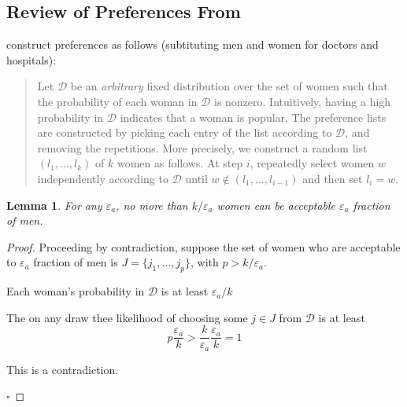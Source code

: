 \documentclass[WP]{AEA}
\newtheorem{lemma}{Lemma}
\begin{document}
\subsection{Review of Preferences From \cite{Immorlica2005}} \label{appendix:immorlica_pref}

\cite{Immorlica2005} construct preferences as follows (subtituting men and women for doctors and hospitals):
\begin{quote}
	Let $\mathcal{D}$ be an \emph{arbitrary} fixed distribution over the set of women such that the probability of each woman in 
	$\mathcal{D}$ is nonzero. Intuitively, having a high probability in $\mathcal{D}$ indicates that a woman is popular. 
	The preference lists are constructed by picking each entry of the list according to $\mathcal{D}$, and removing the repetitions. More precisely, we construct a random list $(l_1, ..., l_k)$
	of $k$ women as follows. At step $i$, repeatedly select women $w$ independently according to $\mathcal{D}$ until $w \notin (l_1, ..., l_{i-1})$ and then set $l_i = w$.
\end{quote}

\begin{lemma}
	For any $\varepsilon_a$, no more than $k/\varepsilon_a$ women can be acceptable $\varepsilon_a$ fraction of men.
\end{lemma}
\begin{proof}
	Proceeding by contradiction, suppose the set of women who are acceptable to $\varepsilon_a$ fraction of men is $J = \{j_1,..., j_p\}$, with $p > k/\varepsilon_a$. 

	Each woman's probability in $\mathcal{D}$ is at least $\varepsilon_a/k$

	The on any draw thee likelihood of choosing some $j\in J$ from $\mathcal{D}$ is at least $$p \frac{\varepsilon_a}{k} > \frac{k}{\varepsilon_a}\frac{\varepsilon_a}{k} = 1$$

	This is a contradiction.

	$\square$


\end{proof}
\end{document}
